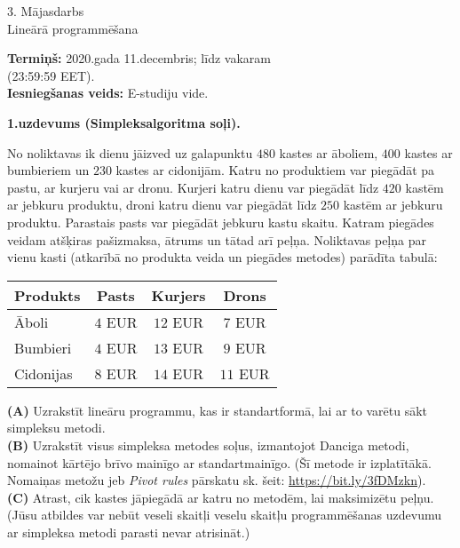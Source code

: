 \documentclass[a4paper]{article}
\begin{document}
\twocolumn

\begin{center}
{\Large 3. Mājasdarbs}\\
{\Large Lineārā programmēšana}
\end{center}

%


{\bf Termiņš:} 2020.gada 11.decembris; līdz vakaram\\ (23:59:59 EET).\\
{\bf Iesniegšanas veids:} E-studiju vide.


\vspace{10pt}
{\bf 1.uzdevums (Simpleksalgoritma soļi).}

No noliktavas ik dienu jāizved uz galapunktu $480$ kastes
ar āboliem, $400$ kastes ar bumbieriem un $230$ kastes ar cidonijām. 
Katru no produktiem var piegādāt pa pastu, ar kurjeru vai ar dronu. 
Kurjeri katru dienu var piegādāt līdz $420$ kastēm ar jebkuru produktu, 
droni katru dienu var pie\-gā\-dāt līdz $250$ kastēm ar jebkuru produktu. 
Parastais pasts var piegādāt jebkuru kastu skaitu. 
Katram piegādes veidam atšķiras pašizmaksa, āt\-rums un tātad \textendash{} arī 
peļņa. Noliktavas peļņa par vienu kasti (atkarībā no produkta veida 
un pie\-gā\-des metodes) 
parādīta tabulā: 

\vspace{4pt}
\begin{tabular}{|l|c|c|c|} \hline
Produkts & Pasts & Kurjers & Drons \\ \hline
Āboli & $4$ EUR & $12$ EUR & $7$ EUR \\ \hline
Bumbieri & $4$ EUR & $13$ EUR & $9$ EUR \\ \hline
Cidonijas & $8$ EUR & $14$ EUR & $11$ EUR \\ \hline
\end{tabular}

\vspace{4pt}
{\bf (A)} Uzrakstīt lineāru programmu, kas ir standartformā, lai ar to varētu sākt simpleksu metodi.\\
{\bf (B)} Uzrakstīt visus simpleksa metodes soļus, izmantojot Danciga metodi, nomainot kārtējo brī\-vo mainīgo 
ar standartmainīgo. (Šī metode ir izplatītākā. Nomaiņas metožu jeb {\em Pivot rules} pār\-ska\-tu sk. 
šeit: \url{https://bit.ly/3fDMzkn}).\\
{\bf (C)} Atrast, cik kastes jāpiegādā ar katru no me\-to\-dēm, lai maksimizētu peļņu. 
(Jūsu atbildes var nebūt veseli skaitļi \textendash{} veselu skaitļu programmēšanas uzdevumu 
ar simpleksa metodi parasti nevar atrisināt.) 
\end{document}
